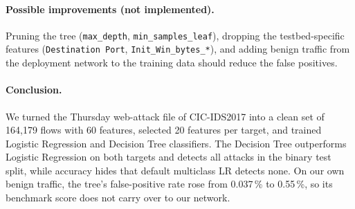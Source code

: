 \paragraph{Possible improvements (not implemented).} Pruning the tree (\texttt{max\_depth}, \texttt{min\_samples\_leaf}), dropping the testbed-specific features (\texttt{Destination Port}, \texttt{Init\_Win\_bytes\_*}), and adding benign traffic from the deployment network to the training data should reduce the false positives.

\paragraph{Conclusion.} We turned the Thursday web-attack file of CIC-IDS2017 into a clean set of 164,179 flows with 60 features, selected 20 features per target, and trained Logistic Regression and Decision Tree classifiers. The Decision Tree outperforms Logistic Regression on both targets and detects all attacks in the binary test split, while accuracy hides that default multiclass LR detects none. On our own benign traffic, the tree's false-positive rate rose from 0.037\,\% to 0.55\,\%, so its benchmark score does not carry over to our network.
